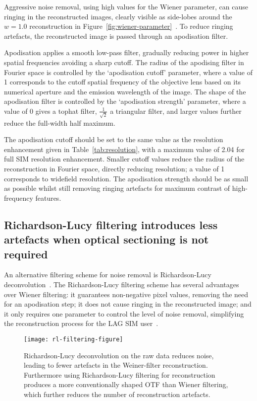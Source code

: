 Aggressive noise removal, using high values for the Wiener parameter, can cause ringing in the reconstructed images, clearly visible as side-lobes around the $w=1.0$ reconstruction in Figure~\ref{fig:wiener-parameter}~\cite{righolt2013image}.
To reduce ringing artefacts, the reconstructed image is passed through an apodisation filter.

Apodisation applies a smooth low-pass filter, gradually reducing power in higher spatial frequencies avoiding a sharp cutoff.
The radius of the apodising filter in Fourier space is controlled by the `apodisation cutoff' parameter, where a value of 1 corresponds to the cutoff spatial frequency of the objective lens based on its numerical aperture and the emission wavelength of the image.
The shape of the apodisation filter is controlled by the `apodisation strength' parameter, where a value of 0 gives a tophat filter, $\frac{1}{\sqrt{2}}$ a triangular filter, and larger values further reduce the full-width half maximum.

The apodisation cutoff should be set to the same value as the resolution enhancement given in Table~\ref{tab:resolution}, with a maximum value of 2.04 for full SIM resolution enhancement.
Smaller cutoff values reduce the radius of the reconstruction in Fourier space, directly reducing resolution; a value of 1 corresponds to widefield resolution.
The apodisation strength should be as small as possible whilst still removing ringing artefacts for maximum contrast of high-frequency features.

\subsection{Richardson-Lucy filtering introduces less artefacts when optical sectioning is not required} \label{sec:RL-filter}
An alternative filtering scheme for noise removal is Richardson-Lucy deconvolution~\cite{perez2016optimal}.
The Richardson-Lucy filtering scheme has several advantages over Wiener filtering: it guarantees non-negative pixel values, removing the need for an apodisation step; it does not cause ringing in the reconstructed image; and it only requires one parameter to control the level of noise removal, simplifying the reconstruction process for the LAG SIM user~\cite{perez2016optimal, eichstadt2013comparison}.

\begin{figure}[p]
\centering
\texttt{[image: rl-filtering-figure]}
\caption[LAG SIM: Richardson-Lucy filtering can further reduce SIM reconstruction artefacts]{Richardson-Lucy deconvolution on the raw data reduces noise, leading to fewer artefacts in the Weiner-filter reconstruction. Furthermore using Richardson-Lucy filtering for reconstruction produces a more conventionally shaped OTF than Wiener filtering, which further reduces the number of reconstruction artefacts.}
\label{fig:rl-filtering}
\end{figure}

